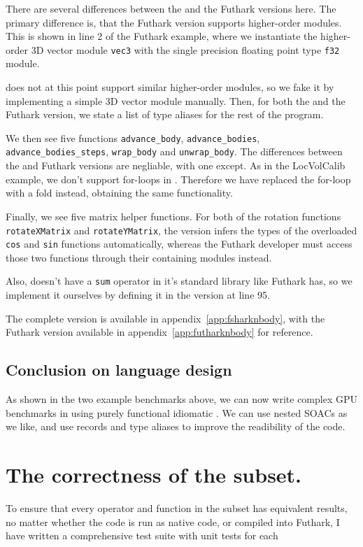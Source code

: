 There are several differences between the \fshark{} and the Futhark versions
here. The primary difference is, that the Futhark version supports higher-order
modules. This is shown in line 2 of the Futhark example, where we instantiate
the higher-order 3D vector module \texttt{vec3} with the single precision floating point
type \texttt{f32} module.

\fshark{} does not at this point support similar higher-order modules, so we
fake it by implementing a simple 3D vector module manually.
Then, for both the \fshark{} and the Futhark version, we state a list of type
aliases for the rest of the program.

We then see five functions \texttt{advance\_body}, \texttt{advance\_bodies},
\texttt{advance\_bodies\_steps}, \texttt{wrap\_body} and \texttt{unwrap\_body}.
The differences between the \fshark{} and Futhark versions are negliable, with
one except.
As in the LocVolCalib example, we don't support for-loops in \fshark{}.
Therefore we have replaced the for-loop with a fold instead, obtaining the same functionality. 

Finally, we see five matrix helper functions. For both of the rotation functions
\texttt{rotateXMatrix} and \texttt{rotateYMatrix}, the \fshark{} version infers
the types of the overloaded \texttt{cos} and \texttt{sin} functions
automatically, whereas the Futhark developer must access those two functions
through their containing modules instead.

Also, \fshark{} doesn't have a \texttt{sum} operator in it's standard library
like Futhark has, so we implement it ourselves by defining it in the \fshark{}
version at line 95.

The complete \fshark{} version is available in
appendix~\ref{app:fsharknbody}, with the Futhark version available in
appendix~\ref{app:futharknbody} for reference.

\subsection{Conclusion on \fshark{} language design}
As shown in the two example benchmarks above, we can now write complex GPU
benchmarks in \fsharp{} using purely functional idiomatic \fsharp{}.
We can use nested SOACs as we like, and use records and type aliases to improve
the readibility of the code.

\section{The correctness of the \fshark{} subset.}
\label{subsec:fsharkcorrectness}
To ensure that every operator and function in the \fshark{} subset has
equivalent results, no matter whether the \fshark{} code is run as native
\fsharp{} code, or compiled into Futhark, I have written a comprehensive test suite with unit
tests for each 

